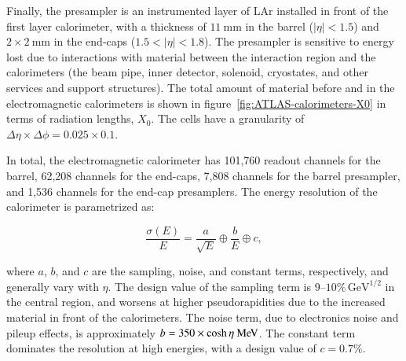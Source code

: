 Finally, the presampler is an instrumented layer of LAr installed in front of the first layer calorimeter, with a thickness of $\SI{11}{\milli\meter}$ in the barrel ($|\eta|<1.5$) and $2\times \SI{2}{\milli\meter}$ in the end-caps ($1.5<|\eta|<1.8$). The presampler is sensitive to energy lost due to interactions with material between the interaction region and the calorimeters (the beam pipe, inner detector, solenoid, cryostates, and other services and support structures). The total amount of material before and in the electromagnetic calorimeters is shown in figure~\ref{fig:ATLAS-calorimeters-X0} in terms of radiation lengths, $X_0$. The cells have a granularity of $\Delta\eta\times\Delta\phi=0.025\times0.1$. 

In total, the electromagnetic calorimeter has 101,760 readout channels for the barrel, 62,208 channels for the end-caps, 7,808 channels for the barrel presampler, and 1,536 channels for the end-cap presamplers. The energy resolution of the calorimeter is parametrized as:

\begin{equation}\label{eqn:experiment-LAr-resolution}
	\frac{\sigma(E)}{E} = \frac{a}{\sqrt{E}} \oplus \frac{b}{E} \oplus c,
\end{equation}

where $a$, $b$, and $c$ are the sampling, noise, and constant terms, respectively, and generally vary with $\eta$. The design value of the sampling term is $9\mbox{--}10\%\,\mbox{GeV}^{1/2}$ in the central region, and worsens at higher pseudorapidities due to the increased material in front of the calorimeters. The noise term, due to electronics noise and pileup effects, is approximately $b = 350 \times \cosh\eta \MeV$. The constant term dominates the resolution at high energies, with a design value of $c=0.7\%$. 


